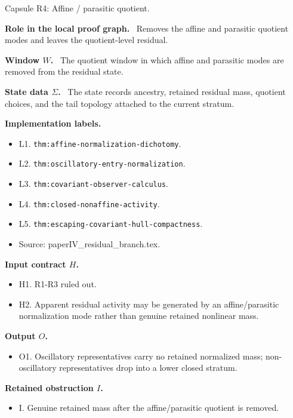 \documentclass[11pt]{amsart}
\newcommand{\capsulefield}[1]{\par\smallskip\noindent\textbf{#1.}\ }
\begin{document}
\begin{proofcapsule}{Capsule R4: Affine / parasitic quotient.}
  \capsulefield{Role in the local proof graph}
  Removes the affine and parasitic quotient modes and leaves the quotient-level residual.

  \capsulefield{Window \(W\)}
The quotient window in which affine and parasitic modes are removed from the residual state.

  \capsulefield{State data \(\Sigma\)}
The state records ancestry, retained residual mass, quotient choices, and the tail topology attached to the current stratum.

  \capsulefield{Implementation labels}
  \begin{itemize}[leftmargin=1.8em]
  \item L1. \texttt{thm:affine-normalization-dichotomy}.
  \item L2. \texttt{thm:oscillatory-entry-normalization}.
  \item L3. \texttt{thm:covariant-observer-calculus}.
  \item L4. \texttt{thm:closed-nonaffine-activity}.
  \item L5. \texttt{thm:escaping-covariant-hull-compactness}.
  \item Source: paperIV\_residual\_branch.tex.
  \end{itemize}

  \capsulefield{Input contract \(H\)}
  \begin{itemize}[leftmargin=1.8em]
  \item H1. R1-R3 ruled out.
  \item H2. Apparent residual activity may be generated by an affine/parasitic normalization mode rather than genuine retained nonlinear mass.
  \end{itemize}

  \capsulefield{Output \(O\)}
  \begin{itemize}[leftmargin=1.8em]
  \item O1. Oscillatory representatives carry no retained normalized mass; non-oscillatory representatives drop into a lower closed stratum.
  \end{itemize}

  \capsulefield{Retained obstruction \(I\)}
  \begin{itemize}[leftmargin=1.8em]
  \item I. Genuine retained mass after the affine/parasitic quotient is removed.
  \end{itemize}


\end{proofcapsule}
\end{document}
